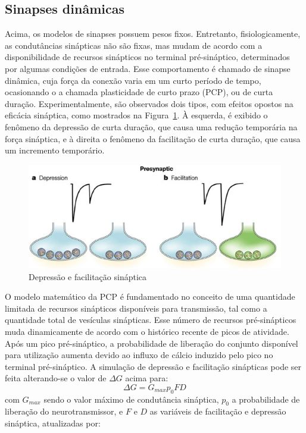 \subsection{Sinapses dinâmicas}\label{subsec:sinapses_dinamicas}
Acima, os modelos de sinapses possuem pesos fixos. Entretanto, fisiologicamente, as condutâncias sinápticas não são fixas, mas mudam de acordo com a disponibilidade de recursos sinápticos no terminal pré-sináptico, determinados por algumas condições de entrada. Esse comportamento é chamado de sinapse dinâmica, cuja força da conexão varia em um curto período de tempo, ocasionando o a chamada plasticidade de curto prazo (PCP), ou de curta duração. Experimentalmente, são observados dois tipos, com efeitos opostos na eficácia sináptica, como mostrados na Figura~\ref{fig:plasticidadecurtaduracao}. À esquerda, é exibido o fenômeno da depressão de curta duração, que causa uma redução temporária na força sináptica, e à direita o fenômeno da facilitação de curta duração, que causa um incremento temporário.
\begin{figure}[tb]
	\centering
	\caption[Depressão e facilitação sináptica]{Depressão e facilitação sináptica}
	\label{fig:plasticidadecurtaduracao}
	\includegraphics[width=0.7\linewidth]{figs/plasticidade_curta_duracao}
\end{figure}
O modelo matemático da PCP é fundamentado no conceito de uma quantidade limitada de recursos sinápticos disponíveis para transmissão, tal como a quantidade total de vesículas sinápticas. Esse número de recursos pré-sinápticos muda dinamicamente de acordo com o histórico recente de picos de atividade. Após um pico pré-sináptico, a probabilidade de liberação do conjunto disponível para utilização aumenta devido ao influxo de cálcio induzido pelo pico no terminal pré-sináptico. A simulação de depressão e facilitação sinápticas pode ser feita alterando-se o valor de $\Delta G$ acima para:
\begin{equation}\label{eq:sinapse_facilitacao_depressao}
	\Delta G=G_{max}p_0FD
\end{equation}
com $G_{max}$ sendo o valor máximo de condutância sináptica, $p_0$ a probabilidade de liberação do neurotransmissor, e $F$ e $D$ as variáveis de facilitação e depressão sináptica, atualizadas por:
